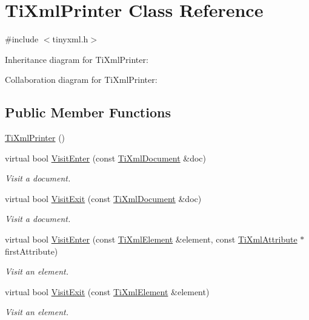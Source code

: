 \hypertarget{class_ti_xml_printer}{\section{Ti\+Xml\+Printer Class Reference}
\label{class_ti_xml_printer}
}


{\ttfamily \#include $<$tinyxml.\+h$>$}



Inheritance diagram for Ti\+Xml\+Printer\+:


Collaboration diagram for Ti\+Xml\+Printer\+:
\subsection*{Public Member Functions}
\begin{DoxyCompactItemize}
\item 
\hyperlink{class_ti_xml_printer_a6539b864026c8667cd0bd5fdf4b41f43}{Ti\+Xml\+Printer} ()
\item 
virtual bool \hyperlink{class_ti_xml_printer_a2ec73087db26ff4d2c4316c56f861db7}{Visit\+Enter} (const \hyperlink{class_ti_xml_document}{Ti\+Xml\+Document} \&doc)
\begin{DoxyCompactList}\small\item\em Visit a document. \end{DoxyCompactList}\item 
virtual bool \hyperlink{class_ti_xml_printer_a0a636046fa589b6d7f3e5bd025b3f33e}{Visit\+Exit} (const \hyperlink{class_ti_xml_document}{Ti\+Xml\+Document} \&doc)
\begin{DoxyCompactList}\small\item\em Visit a document. \end{DoxyCompactList}\item 
virtual bool \hyperlink{class_ti_xml_printer_a6dccaf5ee4979f13877690afe28721e8}{Visit\+Enter} (const \hyperlink{class_ti_xml_element}{Ti\+Xml\+Element} \&element, const \hyperlink{class_ti_xml_attribute}{Ti\+Xml\+Attribute} $\ast$first\+Attribute)
\begin{DoxyCompactList}\small\item\em Visit an element. \end{DoxyCompactList}\item 
virtual bool \hyperlink{class_ti_xml_printer_ae6a1df8271df4bf62d7873c38e34aa69}{Visit\+Exit} (const \hyperlink{class_ti_xml_element}{Ti\+Xml\+Element} \&element)
\begin{DoxyCompactList}\small\item\em Visit an element. \end{DoxyCompactList}\item 

\end{DoxyCompactItemize}
